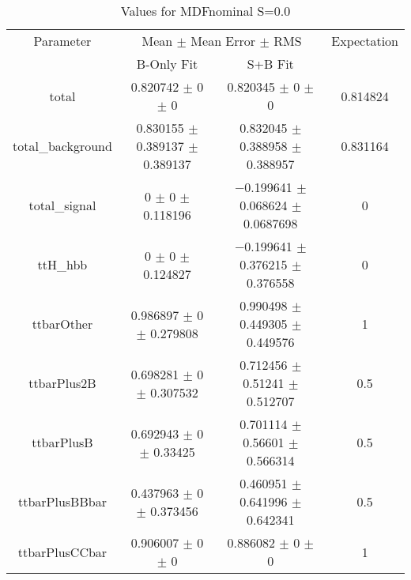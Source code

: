 \begin{table}
\centering
\caption{Values for MDFnominal S=0.0}
\begin{tabular}{cccc}
\toprule
Parameter & \multicolumn{2}{c}{Mean $\pm$ Mean Error $\pm$ RMS} & Expectation\\
 & B-Only Fit & S+B Fit & \\
\midrule
total & \num{0.820742} $\pm$ \num{0} $\pm$ \num{0} & \num{0.820345} $\pm$ \num{0} $\pm$ \num{0} & \num{0.814824}\\
total\_background & \num{0.830155} $\pm$ \num{0.389137} $\pm$ \num{0.389137} & \num{0.832045} $\pm$ \num{0.388958} $\pm$ \num{0.388957} & \num{0.831164}\\
total\_signal & \num{0} $\pm$ \num{0} $\pm$ \num{0.118196} & \num{-0.199641} $\pm$ \num{0.068624} $\pm$ \num{0.0687698} & \num{0}\\
ttH\_hbb & \num{0} $\pm$ \num{0} $\pm$ \num{0.124827} & \num{-0.199641} $\pm$ \num{0.376215} $\pm$ \num{0.376558} & \num{0}\\
ttbarOther & \num{0.986897} $\pm$ \num{0} $\pm$ \num{0.279808} & \num{0.990498} $\pm$ \num{0.449305} $\pm$ \num{0.449576} & \num{1}\\
ttbarPlus2B & \num{0.698281} $\pm$ \num{0} $\pm$ \num{0.307532} & \num{0.712456} $\pm$ \num{0.51241} $\pm$ \num{0.512707} & \num{0.5}\\
ttbarPlusB & \num{0.692943} $\pm$ \num{0} $\pm$ \num{0.33425} & \num{0.701114} $\pm$ \num{0.56601} $\pm$ \num{0.566314} & \num{0.5}\\
ttbarPlusBBbar & \num{0.437963} $\pm$ \num{0} $\pm$ \num{0.373456} & \num{0.460951} $\pm$ \num{0.641996} $\pm$ \num{0.642341} & \num{0.5}\\
ttbarPlusCCbar & \num{0.906007} $\pm$ \num{0} $\pm$ \num{0} & \num{0.886082} $\pm$ \num{0} $\pm$ \num{0} & \num{1}\\
\bottomrule
\end{tabular}
\end{table}